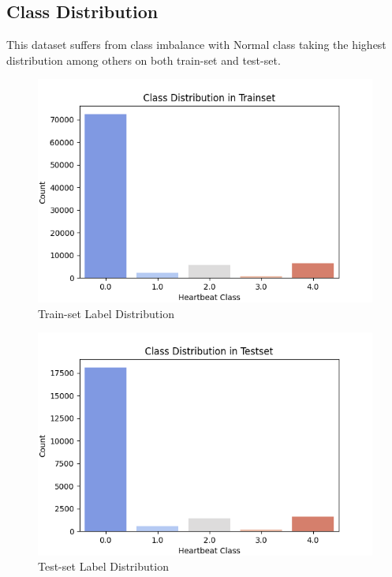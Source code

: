 \documentclass[a4paper,12pt]{article}
\begin{document}
\subsection{Class Distribution}
This dataset suffers from class imbalance with Normal class taking the highest distribution among others on both train-set and test-set.

\begin{figure}
    \centering
    \includegraphics[width=1\linewidth]{figures/Trainset_label_distribution.png}
    \caption{Train-set Label Distribution}
    \label{fig:enter-label}
\end{figure}
\begin{figure}
    \centering
    \includegraphics[width=1\linewidth]{figures/Testset_label_distribution.png}
    \caption{Test-set Label Distribution}
    \label{fig:enter-label}
\end{figure}
\end{document}
